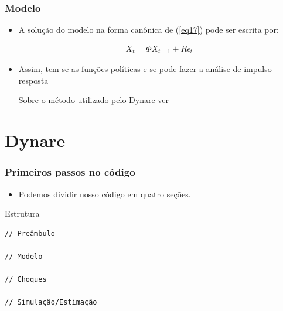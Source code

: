 \documentclass[xcolor=pdftex,dvipsnames,table]{beamer}
\newcommand{\ft}{\frametitle}
\begin{document}
\begin{frame}[fragile]
\ft{Modelo}
\begin{itemize}

\item A solução do modelo na forma canônica de (\ref{eq17}) pode ser escrita por:

\begin{align}
X_t = \Phi X_{t-1} + R \epsilon_t
\end{align}

\item Assim, tem-se as funções políticas e se pode fazer a análise de impulso-resposta

\footnotesize{Sobre o método utilizado pelo Dynare ver }

\end{itemize}
\end{frame}

\section{Dynare}
\begin{frame}[fragile]
\ft{Primeiros passos no código}

\begin{itemize}
\item Podemos dividir nosso código em quatro seções.
\end{itemize}

\begin{block}{Estrutura}
\begin{lstlisting}
// Preâmbulo

// Modelo

// Choques

// Simulação/Estimação
\end{lstlisting}
\end{block}

\end{frame}

\end{document}
